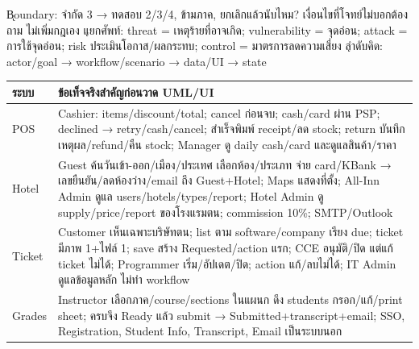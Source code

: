 \k{Boundary}: จำกัด 3 → ทดสอบ 2/3/4, ข้ามภาค, ยกเลิกแล้วนับไหม? เงื่อนไขที่โจทย์ไม่บอกต้องถาม ไม่เพิ่มกฎเอง
\k{แยกศัพท์}: threat = เหตุร้ายที่อาจเกิด; vulnerability = จุดอ่อน; attack = การใช้จุดอ่อน; risk ประเมินโอกาส/ผลกระทบ; control = มาตรการลดความเสี่ยง
\k{ลำดับคิด}: actor/goal → workflow/scenario → data/UI → state
{\smalltable\begin{tabularx}{\linewidth}{|p{6mm}|Y|}\hline
{}ระบบ & ข้อเท็จจริงสำคัญก่อนวาด UML/UI\\\hline
POS & Cashier: items/discount/total; cancel ก่อนจบ; cash/card ผ่าน PSP; declined → retry/cash/cancel; สำเร็จพิมพ์ receipt/ลด stock; return บันทึกเหตุผล/refund/คืน stock; Manager ดู daily cash/card และดูแลสินค้า/ราคา\\\hline
Hotel & Guest ค้นวันเข้า-ออก/เมือง/ประเทศ เลือกห้อง/ประเภท จ่าย card/KBank → เลขยืนยัน/ลดห้องว่าง/email ถึง Guest+Hotel; Maps แสดงที่ตั้ง; All-Inn Admin ดูแล users/hotels/types/report; Hotel Admin ดู supply/price/report ของโรงแรมตน; commission 10\%; SMTP/Outlook\\\hline
Ticket & Customer เห็นเฉพาะบริษัทตน; list ตาม software/company เรียง due; ticket มีภาพ 1+ไฟล์ 1; save สร้าง Requested/action แรก; CCE อนุมัติ/ปิด แต่แก้ ticket ไม่ได้; Programmer เริ่ม/อัปเดต/ปิด; action แก้/ลบไม่ได้; IT Admin ดูแลข้อมูลหลัก ไม่ทำ workflow\\\hline
Grades & Instructor เลือกภาค/course/sections ในแผนก ดึง students กรอก/แก้/print sheet; ครบจึง Ready แล้ว submit → Submitted+transcript+email; SSO, Registration, Student Info, Transcript, Email เป็นระบบนอก\\\hline
\end{tabularx}}
